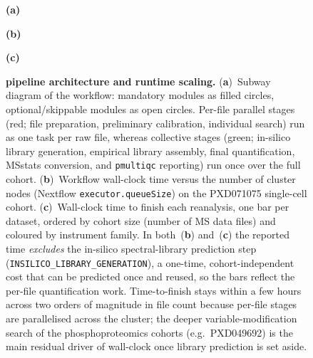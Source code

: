 
\begin{figure}[htbp]
  \centering
  \begin{minipage}{\textwidth}
    \centering
    \begin{minipage}[t]{0.62\linewidth}
      \centering
      \textbf{(a)}\par\vspace{0.2em}
    \end{minipage}\hfill
    \begin{minipage}[t]{0.36\linewidth}
      \centering
      \textbf{(b)}\par\vspace{0.2em}
      \par\vspace{1.0em}
      \textbf{(c)}\par\vspace{0.2em}
    \end{minipage}
  \end{minipage}
  \caption[Pipeline and scaling]{%
    \textbf{\quantmsdiann{} pipeline architecture and runtime scaling.}
    (\textbf{a})~Subway diagram of the \quantmsdiann{} workflow: mandatory
    modules as filled circles, optional/skippable modules as open circles.
    Per-file parallel stages (red; file preparation, preliminary
    calibration, individual search) run as one task per raw file, whereas
    collective stages (green; in-silico library generation, empirical
    library assembly, final quantification, MSstats conversion, and
    \texttt{pmultiqc} reporting) run once over the full cohort.
    (\textbf{b})~Workflow wall-clock time versus the number of cluster nodes
    (Nextflow \texttt{executor.queueSize}) on the PXD071075 single-cell
    cohort.
    (\textbf{c})~Wall-clock time to finish each reanalysis, one bar per
    dataset, ordered by cohort size (number of MS data files) and coloured
    by instrument family. In both~(\textbf{b}) and~(\textbf{c}) the reported
    time \emph{excludes} the in-silico spectral-library prediction step
    (\texttt{INSILICO\_LIBRARY\_GENERATION}), a one-time, cohort-independent
    cost that can be predicted once and reused, so the bars reflect the
    per-file quantification work. Time-to-finish stays within a few hours
    across two orders of magnitude in file count because per-file stages are
    parallelised across the cluster; the deeper variable-modification search
    of the phosphoproteomics cohorts (e.g.\ PXD049692) is the main residual
    driver of wall-clock once library prediction is set aside.
  }
  \label{fig:architecture}
\end{figure}

